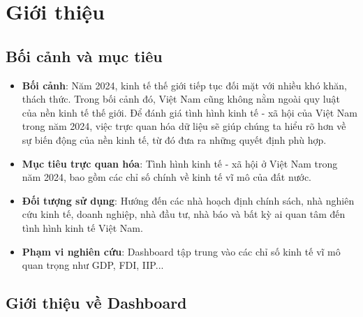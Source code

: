 \documentclass[a4paper]{report}
\begin{document}
\newpage
\section{Giới thiệu}
\subsection{Bối cảnh và mục tiêu}
{\begin{itemize}
    \item \textbf{Bối cảnh}: Năm 2024, kinh tế thế giới tiếp tục đối mặt với nhiều khó khăn, thách thức. Trong bối cảnh đó, Việt Nam cũng không nằm ngoài quy luật của nền kinh tế thế giới. Để đánh giá tình hình kinh tế - xã hội của Việt Nam trong năm 2024, việc trực quan hóa dữ liệu sẽ giúp chúng ta hiểu rõ hơn về sự biến động của nền kinh tế, từ đó đưa ra những quyết định phù hợp.
    \item \textbf{Mục tiêu trực quan hóa}: Tình hình kinh tế - xã hội ở Việt Nam trong năm 2024, bao gồm các chỉ số chính về kinh tế vĩ mô của đất nước.
    \item \textbf{Đối tượng sử dụng}: Hướng đến các nhà hoạch định chính sách, nhà nghiên cứu kinh tế, doanh nghiệp, nhà đầu tư, nhà báo và bất kỳ ai quan tâm đến tình hình kinh tế Việt Nam.
    \item \textbf{Phạm vi nghiên cứu}: Dashboard tập trung vào các chỉ số kinh tế vĩ mô quan trọng như GDP, FDI, IIP... 
\end{itemize}

\subsection{Giới thiệu về Dashboard}

}
\end{document}
